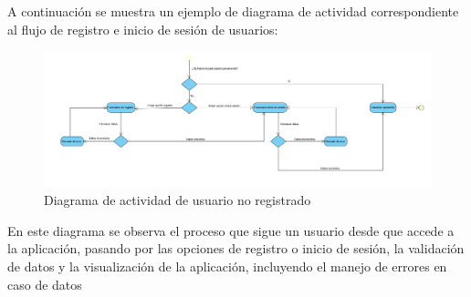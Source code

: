 A continuación se muestra un ejemplo de diagrama de actividad correspondiente al flujo de registro e inicio de sesión de usuarios:

\begin{figure}[H]
    \centering
    \includegraphics[width=1\textwidth]{figs/diagrama_actividad_usuario_no_registrado.png}
    \caption{Diagrama de actividad de usuario no registrado}
\end{figure}

En este diagrama se observa el proceso que sigue un usuario desde que accede a la aplicación, pasando por las opciones de registro o inicio de sesión, la validación de datos y la visualización de la aplicación, incluyendo el manejo de errores en caso de datos

